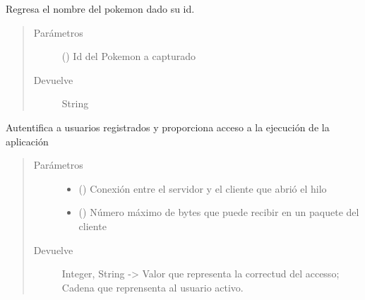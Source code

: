 \documentclass[letterpaper,10pt,spanish,openany,oneside]{sphinxmanual}
\begin{document}
\begin{fulllineitems}
\label{\detokenize{pokemonServer:pokemonServer.getNombrePokemon}}
Regresa el nombre del pokemon dado su id.
\begin{quote}\begin{description}
\item[{Parámetros}] \leavevmode
{} () \textendash{} Id del Pokemon a capturado

\item[{Devuelve}] \leavevmode
String

\end{description}\end{quote}

\end{fulllineitems}


\begin{fulllineitems}
\label{\detokenize{pokemonServer:pokemonServer.giveAccess}}
Autentifica a usuarios registrados y proporciona acceso a la ejecución de la aplicación
\begin{quote}\begin{description}
\item[{Parámetros}] \leavevmode\begin{itemize}
\item {} 
 () \textendash{} Conexión entre el servidor y el cliente que abrió el hilo

\item {} 
 () \textendash{} Número máximo de bytes que puede recibir en un paquete del cliente

\end{itemize}

\item[{Devuelve}] \leavevmode
Integer, String -\textgreater{} Valor que representa la correctud del accesso; Cadena que reprensenta al usuario activo.

\end{description}\end{quote}

\end{fulllineitems}
\end{document}
